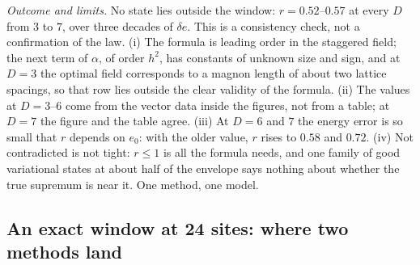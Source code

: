\documentclass[aps,prx,onecolumn,10pt,nofootinbib,longbibliography,floatfix]{revtex4-2}
\theoremstyle{remark}
\newcommand{\de}{\delta e}
\begin{document}
\emph{Outcome and limits.} No state lies outside the window: $r=0.52$--$0.57$ at every $D$ from $3$ to $7$, over %
three decades of $\de$. This is a consistency check, not a confirmation of the law. (i) The formula is leading order
in the staggered field; the next term of $\alpha$, of order $h^2$, has constants of unknown size and sign, and at
$D=3$ the optimal field corresponds to a magnon length of about two lattice spacings, so that row lies outside the %
clear validity of the formula. (ii) The values at $D=3$--$6$ come from the vector data inside the figures, not from a %
table; at $D=7$ the figure and the table agree. (iii) At $D=6$ and $7$ the energy error is so small that $r$ depends %
on $e_0$: with the older value, $r$ rises to $0.58$ and $0.72$. (iv) Not contradicted is not tight: $r\le1$ is all the %
formula needs, and one family of good variational states at about half of the envelope says nothing about whether the
true supremum is near it. One method, one model.

\subsection{An exact window at 24 sites: where two methods land} %
\end{document}
